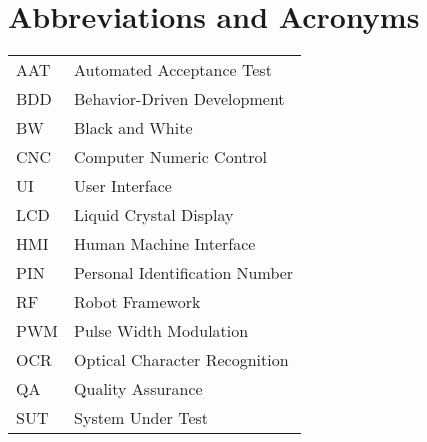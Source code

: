 
\chapter*{Abbreviations and Acronyms}


\noindent
\begin{longtable}{@{}p{}p{}@{}}
AAT & Automated Acceptance Test \\
BDD & Behavior-Driven Development \\
BW & Black and White \\
CNC & Computer Numeric Control \\
UI & User Interface \\
LCD & Liquid Crystal Display \\
HMI & Human Machine Interface \\

PIN & Personal Identification Number \\
RF & Robot Framework \\

PWM & Pulse Width Modulation \\
OCR & Optical Character Recognition \\
QA & Quality Assurance \\
SUT & System Under Test \\


\end{longtable}
